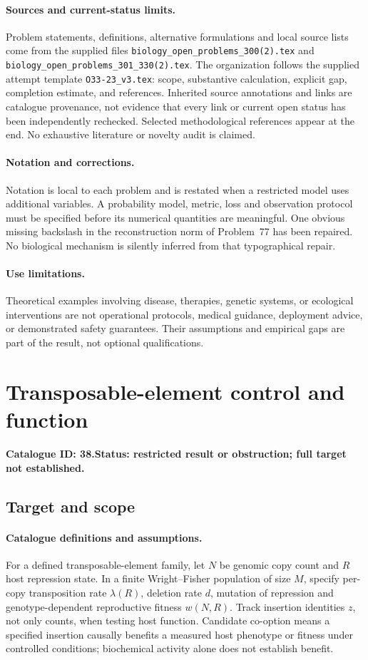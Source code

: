 \documentclass[11pt]{article}
\begin{document}
\paragraph{Sources and current-status limits.}
Problem statements, definitions, alternative formulations and local source lists
come from the supplied files
\texttt{biology\_open\_problems\_300(2).tex} and
\texttt{biology\_open\_problems\_301\_330(2).tex}.
The organization follows the supplied attempt template
\texttt{O33-23\_v3.tex}: scope, substantive calculation, explicit gap,
completion estimate, and references. Inherited source annotations and links are
catalogue provenance, not evidence that every link or current open status has
been independently rechecked. Selected methodological references appear at the
end. No exhaustive literature or novelty audit is claimed.

\paragraph{Notation and corrections.}
Notation is local to each problem and is restated when a restricted model uses
additional variables. A probability model, metric, loss and observation protocol
must be specified before its numerical quantities are meaningful. One obvious
missing backslash in the reconstruction norm of Problem~77 has been repaired.
No biological mechanism is silently inferred from that typographical repair.

\paragraph{Use limitations.}
Theoretical examples involving disease, therapies, genetic systems, or ecological
interventions are not operational protocols, medical guidance, deployment advice,
or demonstrated safety guarantees. Their assumptions and empirical gaps are part
of the result, not optional qualifications.

\setcounter{section}{37}
\section{Transposable-element control and function}
\label{prob:038}
\noindent\textbf{Catalogue ID: 38.}\quad \textbf{Status: restricted result or obstruction; full target not established.}
\subsection{Target and scope}
\paragraph{Catalogue definitions and assumptions.}
For a defined transposable-element family, let $N$ be genomic copy count and $R$ host repression state. In a finite Wright--Fisher population of size $M$, specify per-copy transposition rate $\lambda(R)$, deletion rate $d$, mutation of repression and genotype-dependent reproductive fitness $w(N,R)$. Track insertion identities $z$, not only counts, when testing host function. Candidate co-option means a specified insertion causally benefits a measured host phenotype or fitness under controlled conditions; biochemical activity alone does not establish benefit.
\end{document}
